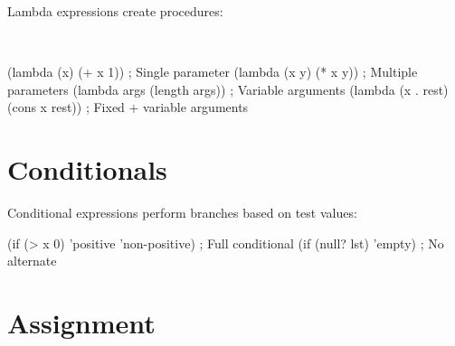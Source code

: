 
Lambda expressions create procedures:

\begin{grammar}
\\
\end{grammar}

\begin{example}
\begin{lambdustcode}
(lambda (x) (+ x 1))           ; Single parameter
(lambda (x y) (* x y))         ; Multiple parameters  
(lambda args (length args))    ; Variable arguments
(lambda (x . rest) 
  (cons x rest))               ; Fixed + variable arguments
\end{lambdustcode}
\end{example}

\section{Conditionals}
\label{sec:conditionals}


Conditional expressions perform branches based on test values:

\begin{grammar}
\end{grammar}

\begin{example}[Conditionals]
\begin{lambdustcode}
(if (> x 0) 'positive 'non-positive)    ; Full conditional
(if (null? lst) 'empty)                 ; No alternate
\end{lambdustcode}
\end{example}

\section{Assignment}
\label{sec:assignment}


